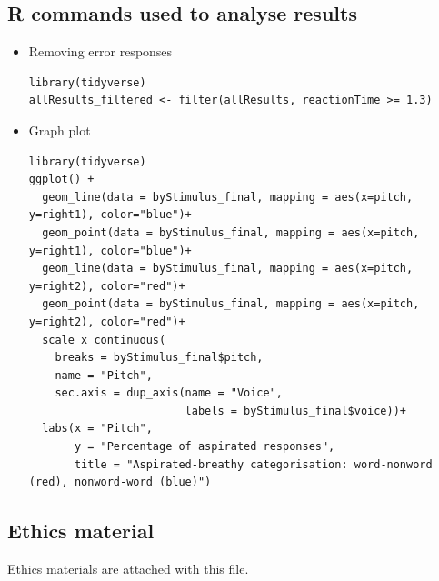 \documentclass[12pt, english]{article}
\begin{document}
\begin{table}[h]
\caption{}
\label{tab:my-table}
\end{table}

\subsection{R commands used to analyse results}
\begin{itemize}
    \item Removing error responses
    \begin{lstlisting}[xleftmargin=0pt]
library(tidyverse)
allResults_filtered <- filter(allResults, reactionTime >= 1.3)
    \end{lstlisting} \vspace{10pt}
    \item Graph plot
    \begin{lstlisting}[xleftmargin=0pt]
library(tidyverse)
ggplot() + 
  geom_line(data = byStimulus_final, mapping = aes(x=pitch, y=right1), color="blue")+
  geom_point(data = byStimulus_final, mapping = aes(x=pitch, y=right1), color="blue")+
  geom_line(data = byStimulus_final, mapping = aes(x=pitch, y=right2), color="red")+
  geom_point(data = byStimulus_final, mapping = aes(x=pitch, y=right2), color="red")+
  scale_x_continuous(
    breaks = byStimulus_final$pitch,
    name = "Pitch",
    sec.axis = dup_axis(name = "Voice",
                        labels = byStimulus_final$voice))+
  labs(x = "Pitch", 
       y = "Percentage of aspirated responses", 
       title = "Aspirated-breathy categorisation: word-nonword (red), nonword-word (blue)")
    \end{lstlisting}
\end{itemize}

\subsection{Ethics material}
Ethics materials are attached with this file.

\end{document}
